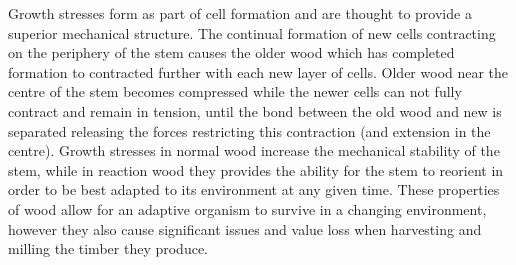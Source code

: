 Growth stresses form as part of cell formation and are thought to provide a
superior mechanical structure. The continual formation of new cells contracting
on the periphery of the stem causes the older wood which has completed formation
to contracted further with each new layer of cells. Older wood near the centre
of the stem becomes compressed while the newer cells can not fully contract and
remain in tension, until the bond between the old wood and new is separated
releasing the forces restricting this contraction (and extension in the centre).
Growth stresses in normal wood increase the mechanical stability of the stem,
while in reaction wood they provides the ability for the stem to reorient in
order to be best adapted to its environment at any given time. These properties
of wood allow for an adaptive organism to survive in a changing environment,
however they also cause significant issues and value loss when harvesting and
milling the timber they produce.
